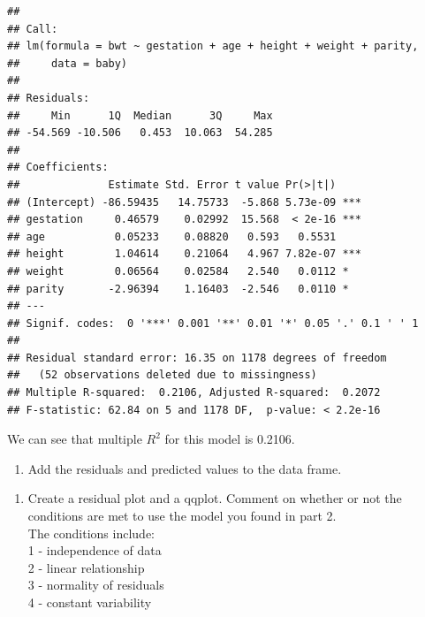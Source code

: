 \documentclass[]{article}
\newenvironment{Shaded}{\begin{snugshade}}{\end{snugshade}}
\newcommand{\KeywordTok}[1]{\textcolor[rgb]{0.13,0.29,0.53}{\textbf{#1}}}
\newcommand{\NormalTok}[1]{#1}
\newcommand{\OperatorTok}[1]{\textcolor[rgb]{0.81,0.36,0.00}{\textbf{#1}}}
\newcommand{\StringTok}[1]{\textcolor[rgb]{0.31,0.60,0.02}{#1}}
\providecommand{\tightlist}{%
  \setlength{\itemsep}{0pt}\setlength{\parskip}{0pt}}
\begin{document}
\begin{Shaded}
\end{Shaded}

\begin{verbatim}
## 
## Call:
## lm(formula = bwt ~ gestation + age + height + weight + parity, 
##     data = baby)
## 
## Residuals:
##     Min      1Q  Median      3Q     Max 
## -54.569 -10.506   0.453  10.063  54.285 
## 
## Coefficients:
##              Estimate Std. Error t value Pr(>|t|)    
## (Intercept) -86.59435   14.75733  -5.868 5.73e-09 ***
## gestation     0.46579    0.02992  15.568  < 2e-16 ***
## age           0.05233    0.08820   0.593   0.5531    
## height        1.04614    0.21064   4.967 7.82e-07 ***
## weight        0.06564    0.02584   2.540   0.0112 *  
## parity       -2.96394    1.16403  -2.546   0.0110 *  
## ---
## Signif. codes:  0 '***' 0.001 '**' 0.01 '*' 0.05 '.' 0.1 ' ' 1
## 
## Residual standard error: 16.35 on 1178 degrees of freedom
##   (52 observations deleted due to missingness)
## Multiple R-squared:  0.2106, Adjusted R-squared:  0.2072 
## F-statistic: 62.84 on 5 and 1178 DF,  p-value: < 2.2e-16
\end{verbatim}

We can see that multiple \(R^2\) for this model is 0.2106.

\newpage

\begin{enumerate}
\def\labelenumi{\arabic{enumi}.}
\setcounter{enumi}{5}
\tightlist
\item
  Add the residuals and predicted values to the data frame.
\end{enumerate}

\begin{Shaded}
\end{Shaded}

\begin{enumerate}
\def\labelenumi{\arabic{enumi}.}
\setcounter{enumi}{6}
\tightlist
\item
  Create a residual plot and a qqplot. Comment on whether or not the
  conditions are met to use the model you found in part 2.\\
  The conditions include:\\
  1 - independence of data\\
  2 - linear relationship\\
  3 - normality of residuals\\
  4 - constant variability
\end{enumerate}
\end{document}
